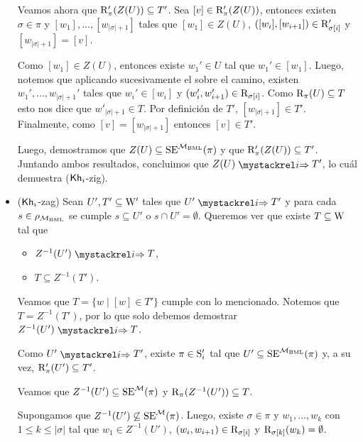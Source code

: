 \begin{demostracion}
\begin{itemize}
        Veamos ahora que $\R'_\pi(Z(U)) \subseteq T'$. Sea $[v] \in \R'_\pi(Z(U))$, entonces existen $\sigma \in \pi$ y 
        $[w_1], ..., [w_{|\sigma|+1}]$ tales que $[w_1] \in Z(U)$, $([w_i],[w_{i+1}]) \in \R'_{\sigma[i]}$ y $[w_{|\sigma|+1}] = [v]$.

        Como $[w_1] \in Z(U)$, entonces existe $w_1' \in U$ tal que $w_1'\in [w_1]$. Luego, notemos que aplicando sucesivamente el 
         sobre el camino, existen $w_1',...,w_{|\sigma|+1}'$ tales que $w_i' \in [w_i]$ y $(w_i',w_{i+1}')\in \R_{\sigma[i]}$.
        Como $\R_\pi(U) \subseteq T$ esto nos dice que $w'_{|\sigma|+1} \in T$. Por definición de 
        $T'$, $[w_{|\sigma|+1}] \in T'$. Finalmente, como $[v] = [w_{|\sigma|+1}]$ entonces $[v] \in T'$.

        Luego, demostramos que $Z(U)\subseteq\sexec^{\model_\bml}(\pi)$ y que $\R'_\pi(Z(U)) \subseteq T'$. 
        Juntando ambos resultados, concluimos que $Z(U) \ultsExecAgi T'$, lo cuál demuestra ($\khi$-zig).

       \item ($\khi$-zag) Sean $U', T' \subseteq \W'$ tales que $U' \ultsExecAgi T'$ y para cada $s \in \rho_{\model_\bml}$ se cumple 
       $s \subseteq U'$ o $s \cap U' = \emptyset$. Queremos ver que existe $T \subseteq \W$ tal que

       \begin{multicols}{2}
            \begin{itemize}
                \item $Z^{-1}(U') \ultsExecAgi T$, 
                \item $T \subseteq Z^{-1}(T')$.
            \end{itemize}
        \end{multicols}

        Veamos que $T = \{w \mid [w] \in T'\}$ cumple con lo mencionado. Notemos que $T = Z^{-1}(T')$, por lo que solo debemos demostrar 
        $Z^{-1}(U') \ultsExecAgi T$.

        Como $U' \ultsExecAgi T'$, existe $\pi \in \S'_i$ tal que $U' \subseteq \sexec^{\model_\bml}(\pi)$ y, a su vez, 
        $\R'_\pi(U') \subseteq T'$.

        Veamos que $Z^{-1}(U') \subseteq \sexec^{\model}(\pi)$ y $\R_\pi(Z^{-1}(U')) \subseteq T$.

        Supongamos que $Z^{-1}(U')\not\subseteq\sexec^{\model}(\pi)$. Luego, existe $\sigma \in \pi$ y $w_1,...,w_k$ con 
        $1 \le k \le |\sigma|$ tal que $w_1\in Z^{-1}(U')$, $(w_i,w_{i+1}) \in \R_{\sigma[i]}$ y $\R_{\sigma[k]}(w_k) = \emptyset$. 


\end{itemize}
\end{demostracion}
